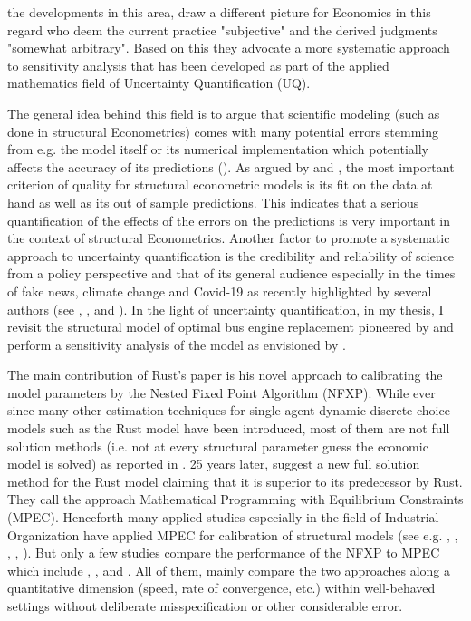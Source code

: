 the developments in this area, \cite{Harenberg.2019} draw a different picture for Economics in this regard who deem the current practice "subjective" and the derived judgments "somewhat arbitrary". Based on this they advocate a more systematic approach to sensitivity analysis that has been developed as part of the applied mathematics field of Uncertainty Quantification (UQ).

The general idea behind this field is to argue that scientific modeling (such as done in structural Econometrics) comes with many potential errors stemming from e.g. the model itself or its numerical implementation which potentially affects the accuracy of its predictions (\cite{Smith.2013}). As argued by \cite{Keane.2010} and \cite{Rust.2010}, the most important criterion of quality for structural econometric models is its fit on the data at hand as well as its out of sample predictions. This indicates that a serious quantification of the effects of the errors on the predictions is very important in the context of structural Econometrics. Another factor to promote a systematic approach to uncertainty quantification is the credibility and reliability of science from a policy perspective and that of its general audience especially in the times of fake news, climate change and Covid-19 as recently highlighted by several authors (see \cite{Fischhoff.2014} \cite{DeBruin.2019}, \cite{VanDerBles.2019}, \cite{Manski.2019} and \cite{Manski.2020}). In the light of uncertainty quantification, in my thesis, I revisit the structural model of optimal bus engine replacement pioneered by \cite{Rust.1987} and perform a sensitivity analysis of the model as envisioned by \cite{Leamer.1983}.

The main contribution of Rust's paper is his novel approach to calibrating the model parameters by the Nested Fixed Point Algorithm (NFXP). While ever since many other estimation techniques for single agent dynamic discrete choice models such as the Rust model have been introduced, most of them are not full solution methods (i.e. not at every structural parameter guess the economic model is solved) as reported in \cite{Aguirregabiri.2010}. 25 years later, \cite{Su.Judd.2012} suggest a new full solution method for the Rust model claiming that it is superior to its predecessor by Rust. They call the approach Mathematical Programming with Equilibrium Constraints (MPEC). Henceforth many applied studies especially in the field of Industrial Organization have applied MPEC for calibration of structural models (see e.g. \cite{Aryal.2013}, \cite{Kaiser.2014}, \cite{Hubbard.2009}, \cite{Reynaert.2014}, \cite{Freyberger.2015}). But only a few studies compare the performance of the NFXP to MPEC which include \cite{Su.Judd.2012}, \cite{Dube.Fox.Su.2012}, \cite{Iskhakov.2016} and \cite{Dong.Hsieh.Zhang.2017}. All of them, mainly compare the two approaches along a quantitative dimension (speed, rate of convergence, etc.) within well-behaved settings without deliberate misspecification or other considerable error.

